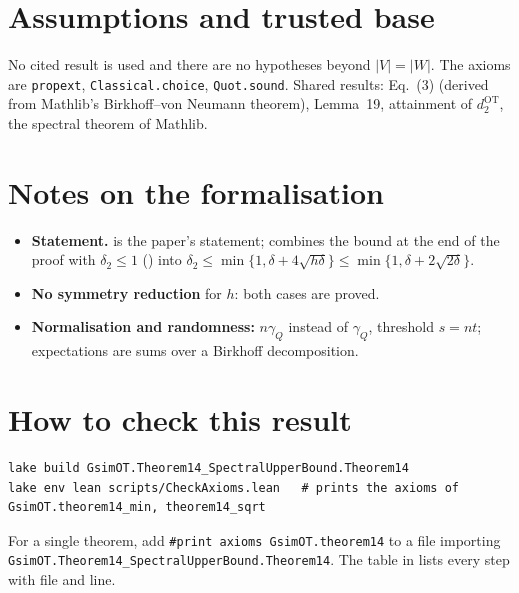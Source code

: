 \section{Assumptions and trusted base}
No cited result is used and there are no hypotheses beyond $|V|=|W|$. The axioms are \texttt{propext},
\texttt{Classical.choice}, \texttt{Quot.sound}. Shared results: Eq.~(3) (derived from Mathlib's Birkhoff--von
Neumann theorem), Lemma~19, attainment of $d^{\mathrm{OT}}_2$, the spectral theorem of Mathlib.

\section{Notes on the formalisation}
\begin{itemize}
\item \textbf{Statement.}  is the paper's statement;  combines the bound
   at the end of the proof with $\delta_2\le1$ () into
  $\delta_2\le\min\{1,\delta+4\sqrt{h\delta}\}\le\min\{1,\delta+2\sqrt{2\delta}\}$.
\item \textbf{No symmetry reduction} for $h$: both cases are proved.
\item \textbf{Normalisation and randomness:} $n\gamma_Q$ instead of $\gamma_Q$, threshold $s=nt$; expectations are
  sums over a Birkhoff decomposition.
\end{itemize}

\section{How to check this result}
\begin{verbatim}
lake build GsimOT.Theorem14_SpectralUpperBound.Theorem14
lake env lean scripts/CheckAxioms.lean   # prints the axioms of GsimOT.theorem14_min, theorem14_sqrt
\end{verbatim}
For a single theorem, add \verb|#print axioms GsimOT.theorem14| to a file importing
\verb|GsimOT.Theorem14_SpectralUpperBound.Theorem14|. The table in  lists every
step with file and line.


